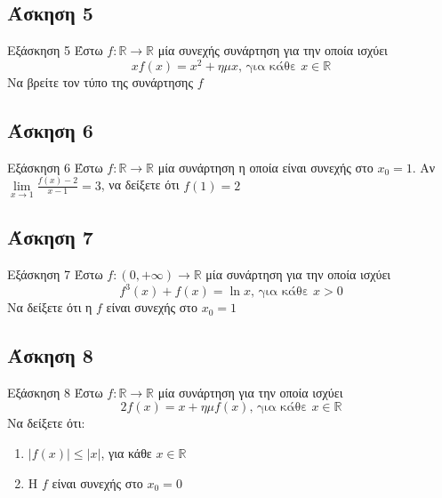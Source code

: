 \documentclass[greek]{beamer}
\begin{document}
\subsection{Άσκηση 5}
\begin{frame}[label=Άσκηση5]{Εξάσκηση 5}
        Έστω $f:\mathbb{R}\to\mathbb{R}$ μία συνεχής συνάρτηση για την οποία ισχύει
        $$xf(x)=x^2+ημx \text{, για κάθε } x\in\mathbb{R}$$
        Να βρείτε τον τύπο της συνάρτησης $f$

\end{frame}

\subsection{Άσκηση 6}
\begin{frame}[label=Άσκηση6]{Εξάσκηση 6}
        Έστω $f:\mathbb{R}\to\mathbb{R}$ μία συνάρτηση η οποία είναι συνεχής στο $x_0=1$. Αν $\lim\limits_{x \to 1}{ \frac{f(x)-2}{x-1} }=3$, να δείξετε ότι $f(1)=2$

\end{frame}

\subsection{Άσκηση 7}
\begin{frame}[label=Άσκηση7]{Εξάσκηση 7}
        Έστω $f:(0,+\infty)\to\mathbb{R}$ μία συνάρτηση για την οποία ισχύει
        $$f^3(x)+f(x)=\ln x \text{, για κάθε } x>0$$
        Να δείξετε ότι η $f$ είναι συνεχής στο $x_0=1$

\end{frame}

\subsection{Άσκηση 8}
\begin{frame}[label=Άσκηση8]{Εξάσκηση 8}
        Έστω $f:\mathbb{R}\to\mathbb{R}$ μία συνάρτηση για την οποία ισχύει
        $$2f(x)=x+ημf(x) \text{, για κάθε } x\in\mathbb{R}$$
        Να δείξετε ότι:
        \begin{enumerate}
                \item<1-> $|f(x)|\le |x|$, για κάθε $x\in\mathbb{R}$
                \item<2-> Η $f$ είναι συνεχής στο $x_0=0$
        \end{enumerate}

\end{frame}
\end{document}
